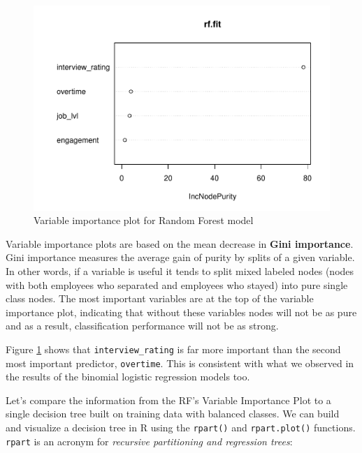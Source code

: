 \documentclass[
]{book}
\begin{document}
\begin{figure}

{\centering \includegraphics[width=1\linewidth]{The_Fundamentals_of_People_Analytics_files/figure-latex/var-imp-plot-1} 

}

\caption{Variable importance plot for Random Forest model}\label{fig:var-imp-plot}
\end{figure}

Variable importance plots are based on the mean decrease in \textbf{Gini importance}. Gini importance measures the average gain of purity by splits of a given variable. In other words, if a variable is useful it tends to split mixed labeled nodes (nodes with both employees who separated and employees who stayed) into pure single class nodes. The most important variables are at the top of the variable importance plot, indicating that without these variables nodes will not be as pure and as a result, classification performance will not be as strong.

Figure \ref{fig:var-imp-plot} shows that \texttt{interview\_rating} is far more important than the second most important predictor, \texttt{overtime}. This is consistent with what we observed in the results of the binomial logistic regression models too.

Let's compare the information from the RF's Variable Importance Plot to a single decision tree built on training data with balanced classes. We can build and visualize a decision tree in R using the \texttt{rpart()} and \texttt{rpart.plot()} functions. \texttt{rpart} is an acronym for \emph{recursive partitioning and regression trees}:
\end{document}
